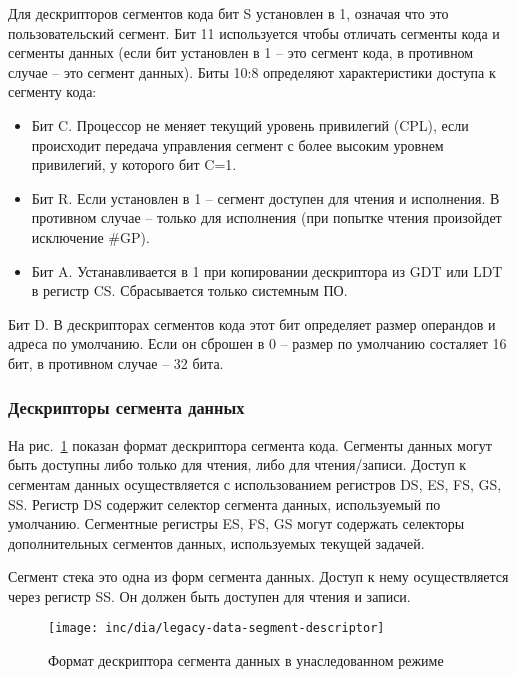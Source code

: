 Для дескрипторов сегментов кода бит S установлен в 1, означая что это пользовательский сегмент. Бит 11
используется чтобы отличать сегменты кода и сегменты данных (если бит установлен в 1 -- это сегмент кода,
в противном случае -- это сегмент данных). Биты 10:8 определяют характеристики доступа к сегменту кода:
\begin{itemize}
	\item Бит C. Процессор не меняет текущий уровень привилегий (CPL), если происходит передача управления
		сегмент с более высоким уровнем привилегий, у которого бит C=1.
	\item Бит R. Если установлен в 1 -- сегмент доступен для чтения и исполнения. В противном случае --
		только для исполнения (при попытке чтения произойдет исключение \#GP).
	\item Бит A. Устанавливается в 1 при копировании дескриптора из GDT или LDT в регистр CS. Сбрасывается
		только системным ПО.
\end{itemize}

Бит D. В дескрипторах сегментов кода этот бит определяет размер операндов и адреса по умолчанию.
Если он сброшен в 0 -- размер по умолчанию состаляет 16 бит, в противном случае -- 32 бита.

\subsubsection*{Дескрипторы сегмента данных}
На рис.~\ref{fig:legacy-data-segment-descriptor-format} показан формат дескриптора сегмента кода.
Сегменты данных могут быть доступны либо только для чтения, либо для чтения/записи. Доступ к сегментам
данных осуществляется с использованием регистров DS, ES, FS, GS, SS. Регистр DS содержит селектор
сегмента данных, используемый по умолчанию. Сегментные регистры ES, FS, GS могут содержать селекторы
дополнительных сегментов данных, используемых текущей задачей.

Сегмент стека это одна из форм сегмента данных. Доступ к нему осуществляется через регистр SS. Он должен
быть доступен для чтения и записи.

\begin{figure}[ht]
  \centering
  \texttt{[image: inc/dia/legacy-data-segment-descriptor]}
  \caption{Формат дескриптора сегмента данных в унаследованном режиме}
  \label{fig:legacy-data-segment-descriptor-format}
\end{figure}

